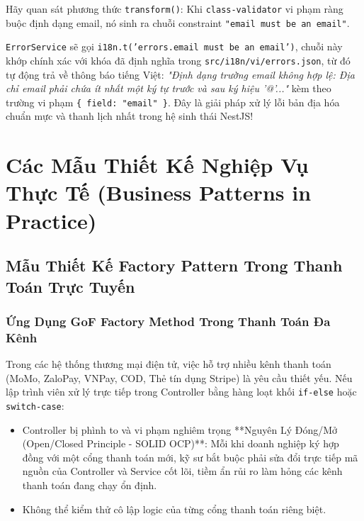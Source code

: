 \documentclass[12pt,a4paper,oneside]{book}
\begin{document}
\begin{infobox}
  Hãy quan sát phương thức \texttt{transform()}: Khi \texttt{class-validator} vi phạm ràng buộc định dạng email, nó sinh ra chuỗi constraint \texttt{"email must be an email"}. 
  
  \texttt{ErrorService} sẽ gọi \texttt{i18n.t('errors.email must be an email')}, chuỗi này khớp chính xác với khóa đã định nghĩa trong \texttt{src/i18n/vi/errors.json}, từ đó tự động trả về thông báo tiếng Việt: \textit{"Định dạng trường email không hợp lệ: Địa chỉ email phải chứa ít nhất một ký tự trước và sau ký hiệu '@'..."} kèm theo trường vi phạm \texttt{\{ field: "email" \}}. Đây là giải pháp xử lý lỗi bản địa hóa chuẩn mực và thanh lịch nhất trong hệ sinh thái NestJS!
\end{infobox}

\part{Các Mẫu Thiết Kế Nghiệp Vụ Thực Tế (Business Patterns in Practice)}

\chapter{Mẫu Thiết Kế Factory Pattern Trong Thanh Toán Trực Tuyến}

\section{Ứng Dụng GoF Factory Method Trong Thanh Toán Đa Kênh}
Trong các hệ thống thương mại điện tử, việc hỗ trợ nhiều kênh thanh toán (MoMo, ZaloPay, VNPay, COD, Thẻ tín dụng Stripe) là yêu cầu thiết yếu. Nếu lập trình viên xử lý trực tiếp trong Controller bằng hàng loạt khối \texttt{if-else} hoặc \texttt{switch-case}:
\begin{itemize}
  \item Controller bị phình to và vi phạm nghiêm trọng **Nguyên Lý Đóng/Mở (Open/Closed Principle - SOLID OCP)**: Mỗi khi doanh nghiệp ký hợp đồng với một cổng thanh toán mới, kỹ sư bắt buộc phải sửa đổi trực tiếp mã nguồn của Controller và Service cốt lõi, tiềm ẩn rủi ro làm hỏng các kênh thanh toán đang chạy ổn định.
  \item Không thể kiểm thử cô lập logic của từng cổng thanh toán riêng biệt.
\end{itemize}
\end{document}
